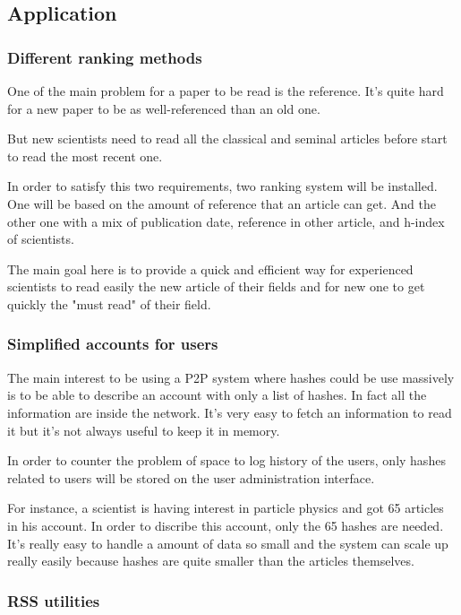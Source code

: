 \subsection{Application}

\subsubsection{Different ranking methods}

One of the main problem for a paper to be read is the reference. It's
quite hard for a new paper to be as well-referenced than an old one.

But new scientists need to read all the classical and seminal 
articles before start to read the most recent one.

In order to satisfy this two requirements, two ranking system will
be installed. One will be based on the amount of reference that an
article can get. And the other one with a mix of publication date,
reference in other article, and h-index of scientists.

The main goal here is to provide a quick and efficient way for
experienced scientists to read easily the new article of their fields
and for new one to get quickly the "must read" of their field.

\subsubsection{Simplified accounts for users}

The main interest to be using a P2P system where hashes could be use massively is
to be able to describe an account with only a list of hashes.
In fact all the information are inside the network. It's very easy to fetch an information
to read it but it's not always useful to keep it in memory.

In order to counter the problem of space to log history of the users, only hashes
related to users will be stored on the user administration interface.

For instance, a scientist is having interest in particle physics and got 65
articles in his account. In order to discribe this account, only the 65 hashes are needed.
It's really easy to handle a amount of data so small and the system can scale up really easily
because hashes are quite smaller than the articles themselves.

\subsubsection{RSS utilities}

